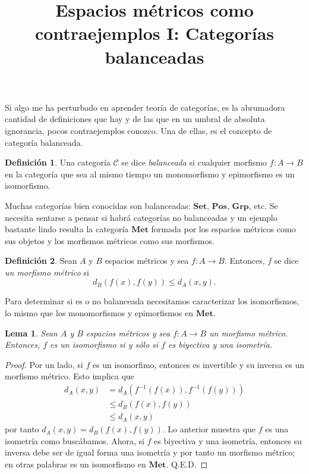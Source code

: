\documentclass[letter,10pt,notitlepage]{amsart}
\title{Espacios métricos como contraejemplos I: Categorías balanceadas}
\date{}
\newtheorem{lemma}{Lema}
\theoremstyle{definition}
\newtheorem*{definition}{Definición}
\theoremstyle{remark}
\begin{document}
\maketitle

Si algo me ha perturbado en aprender teoría de categorías, es 
la abrumadora cantidad de definiciones que hay y de las que
en un umbral de absoluta ignorancia, pocos contraejemplos
conozco. Una de ellas, es el concepto de categoría balanceada.

\begin{definition}
  Una categoría \( \mathcal{C}\) se dice \emph{balanceada}
  si cualquier morfismo \( f \colon A \to B\) en la categoría
  que sea al mismo tiempo un monomorfismo y epimorfismo
  es un isomorfismo.
\end{definition}

Muchas categorías bien conocidas son balanceadas: \( \mathbf{Set}\),
\( \mathbf{Pos}\), \( \mathbf{Grp}\), etc. Se necesita sentarse
a pensar si habrá categorías no balanceadas y un ejemplo bastante
lindo resulta la categoría \( \mathbf{Met}\) formada por
los espacios métricos como sus objetos y los morfismos métricos
como sus morfismos.

\begin{definition}
  Sean \( A\) y \( B\) espacios métricos y sea
  \( f \colon A \to B\). Entonces, \( f\) se dice \emph{un
  morfismo métrico} si 
  \[ d_B(f(x),f(y)) \leq d_A(x,y).\]
\end{definition}

Para determinar si es o no balanceada necesitamos caracterizar
los isomorfismos, lo mismo que los monomorfismos y epimorfismos en 
\( \mathbf{Met}\). 

\begin{lemma}
  Sean \( A\) y \( B\) espacios métricos y sea \( f \colon A \to B\)
  un morfismo métrico. Entonces, \( f\) es un isomorfismo
  si y sólo si  \( f\) es biyectiva y una isometría.
\end{lemma}
\begin{proof}
  Por un lado, si \( f\) es un isomorfimo, entonces es invertible y 
  su inversa es un morfismo métrico. Esto implica que
  \begin{align*}
    d_A(x,y) &= d_A\left( f^{-1}(f(x)), f^{-1}(f(y)) \right) \\
    	&\leq d_B(f(x),f(y)) \\
	& \leq d_A(x,y)
  \end{align*}
  por tanto \( d_A(x,y) = d_B(f(x),f(y))\). Lo anterior muestra que \( f\)
  es una isometría como buscábamos. Ahora, si \( f\) es biyectiva y 
  una isometría, entonces su inversa debe ser de igual forma una
  isometría y por tanto un morfismo métrico; en otras palabras
  es un isomorfismo en \( \mathbf{Met}\). Q.E.D.
\end{proof}
\end{document}
